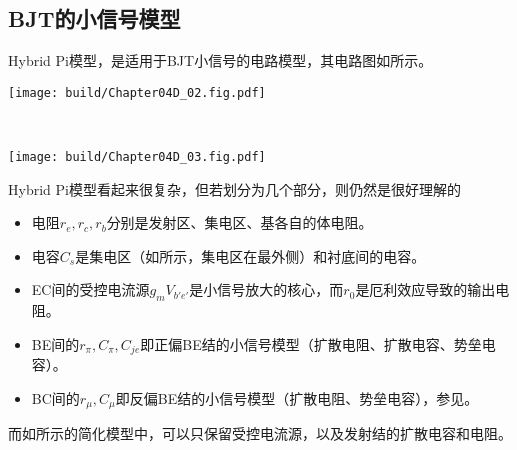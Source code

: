 \subsection{BJT的小信号模型}
Hybrid Pi模型，是适用于BJT小信号的电路模型，其电路图如所示。
\begin{Figure}
    \begin{FigureSub}[完整模型]
        \texttt{[image: build/Chapter04D\_02.fig.pdf]}   
    \end{FigureSub}\\ \vspace{0.75cm}
    \begin{FigureSub}[简化模型]
        \texttt{[image: build/Chapter04D\_03.fig.pdf]}   
    \end{FigureSub}
\end{Figure}

Hybrid Pi模型看起来很复杂，但若划分为几个部分，则仍然是很好理解的
\begin{itemize}
    \item 电阻$r_e,r_c,r_b$分别是发射区、集电区、基各自的体电阻。
    \item 电容$C_s$是集电区（如所示，集电区在最外侧）和衬底间的电容。
    \item EC间的受控电流源$g_mV_{b'e'}$是小信号放大的核心，而$r_0$是厄利效应导致的输出电阻。
    \item BE间的$r_{\pi},C_{\pi},C_{je}$即正偏BE结的小信号模型（扩散电阻、扩散电容、势垒电容）。
    \item BC间的$r_{\mu},C_{\mu}$即反偏BE结的小信号模型（扩散电阻、势垒电容），参见。
\end{itemize}
而如所示的简化模型中，可以只保留受控电流源，以及发射结的扩散电容和电阻。